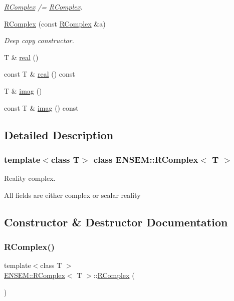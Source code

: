 \begin{DoxyCompactItemize}
\begin{DoxyCompactList}\small\item\em \mbox{\hyperlink{classENSEM_1_1RComplex}{R\+Complex}} /= \mbox{\hyperlink{classENSEM_1_1RComplex}{R\+Complex}}. \end{DoxyCompactList}\item 
\mbox{\hyperlink{classENSEM_1_1RComplex_acfff70ac44afad9aa6848f117f86b675}{R\+Complex}} (const \mbox{\hyperlink{classENSEM_1_1RComplex}{R\+Complex}} \&a)
\begin{DoxyCompactList}\small\item\em Deep copy constructor. \end{DoxyCompactList}\item 
T \& \mbox{\hyperlink{classENSEM_1_1RComplex_a1675e3defa774edeb1a7390bd14a86c8}{real}} ()
\item 
const T \& \mbox{\hyperlink{classENSEM_1_1RComplex_a0a055b8b16ef4c73ab5fb4e5ff93c7f1}{real}} () const
\item 
T \& \mbox{\hyperlink{classENSEM_1_1RComplex_af4f97cf18c025407a8e66f848252243d}{imag}} ()
\item 
const T \& \mbox{\hyperlink{classENSEM_1_1RComplex_a8df643a2ba06dc851d19eb35cd4c4cde}{imag}} () const
\end{DoxyCompactItemize}


\subsection{Detailed Description}
\subsubsection*{template$<$class T$>$\newline
class E\+N\+S\+E\+M\+::\+R\+Complex$<$ T $>$}

Reality complex. 

All fields are either complex or scalar reality 

\subsection{Constructor \& Destructor Documentation}
\mbox{\label{classENSEM_1_1RComplex_a5c5fc0c5c776dc45229f8702053962e5}} 
\subsubsection{\texorpdfstring{RComplex()}{RComplex()}\hspace{0.1cm}{\footnotesize\ttfamily [1/8]}}
{\footnotesize\ttfamily template$<$class T $>$ \\
\mbox{\hyperlink{classENSEM_1_1RComplex}{E\+N\+S\+E\+M\+::\+R\+Complex}}$<$ T $>$\+::\mbox{\hyperlink{classENSEM_1_1RComplex}{R\+Complex}} (\begin{DoxyParamCaption}{ }\end{DoxyParamCaption})\hspace{0.3cm}{\ttfamily [inline]}}

